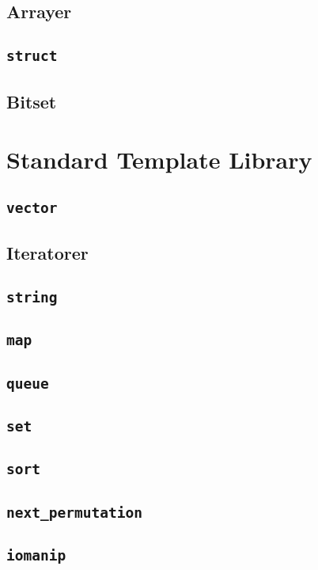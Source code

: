 \documentclass[10pt,a4paper]{report}
\begin{document}
\subsection{Arrayer}
\subsection{\texttt{struct}}
\subsection{Bitset}

\section{Standard Template Library}
\subsection{\texttt{vector}}
\subsection{Iteratorer}
\subsection{\texttt{string}}
\subsection{\texttt{map}}
\subsection{\texttt{queue}}
\subsection{\texttt{set}}
\subsection{\texttt{sort}}
\subsection{\texttt{next\_permutation}}
\subsection{\texttt{iomanip}}
\end{document}
